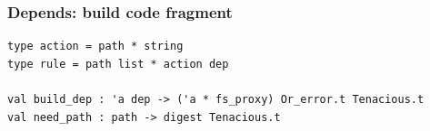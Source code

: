 \documentclass{beamer}
\begin{document}

% 




\begin{frame}[fragile]
\frametitle{Depends: build code fragment}
{\footnotesize
\begin{verbatim}
type action = path * string
type rule = path list * action dep

val build_dep : 'a dep -> ('a * fs_proxy) Or_error.t Tenacious.t
val need_path : path -> digest Tenacious.t

\end{verbatim}}
\end{frame}


% 
% 
\end{document}
